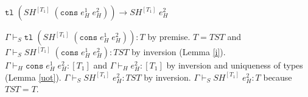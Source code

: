\begin{case}
$\mathtt{tl}\;(SH^{[T_{1}]}\;(\mathtt{cons}\;e_{H}^{1}\;e_{H}^{2}))\rightarrow SH^{[T_{1}]}\;e_{H}^{2}$

$\Gamma\vdash_{S}\mathtt{tl}\;(SH^{[T_{1}]}\;(\mathtt{cons}\;e_{H}^{1}\;e_{H}^{2})):T$ by premise.  $T=TST$ and $\Gamma\vdash_{S}SH^{[T_{1}]}\;(\mathtt{cons}\;e_{H}^{1}\;e_{H}^{2}):TST$ by inversion (Lemma \ref{i}).  $\Gamma\vdash_{H}\mathtt{cons}\;e_{H}^{1}\;e_{H}^{2}:[T_{1}]$ and $\Gamma\vdash_{H}e_{H}^{2}:[T_{1}]$ by inversion and uniqueness of types (Lemma \ref{uot}).  $\Gamma\vdash_{S}SH^{[T_{1}]}\;e_{H}^{2}:TST$ by inversion.  $\Gamma\vdash_{S}SH^{[T_{1}]}\;e_{H}^{2}:T$ because $TST=T$.
\end{case}